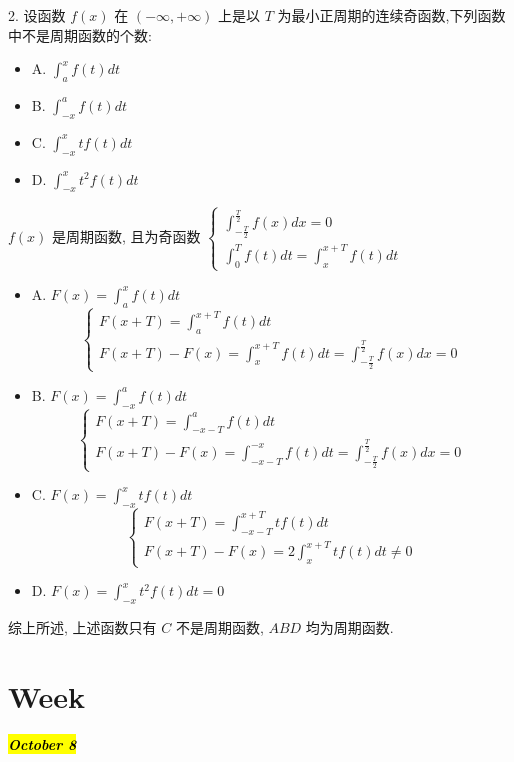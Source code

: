 2. 设函数 $f(x)$ 在 $(-\infty,+\infty)$ 上是以 $T$ 为最小正周期的连续奇函数,下列函数中不是周期函数的个数:  
\begin{itemize}
	\item A. $\int_{a}^{x}f(t)dt$
	\item B. $\int_{-x}^{a}f(t)dt$
	\item C. $\int_{-x}^{x}tf(t)dt$
	\item D. $\int_{-x}^{x}t^2f(t)dt$
\end{itemize}
\begin{solution}

	$f(x)$ 是周期函数, 且为奇函数 $
	\begin{cases}
		\displaystyle{\int_{-\frac{T}{2}}^{\frac{T}{2}}f(x)dx = 0}\\
		\displaystyle{\int_{0}^{T}f(t)dt = \int_{x}^{x+T}f(t)dt}
	\end{cases}$
	
	\begin{itemize}
		\item A. $\displaystyle{F(x) = \int_{a}^{x}f(t)dt}$
		$$
		\begin{cases}
			\displaystyle{F(x+T) = \int_{a}^{x+T}f(t)dt}\\
			\displaystyle{F(x+T)-F(x) = \int_{x}^{x+T}f(t)dt=\int_{-\frac{T}{2}}^{\frac{T}{2}}f(x)dx = 0}
		\end{cases}
		$$
		\item B. $\displaystyle{F(x)=\int_{-x}^{a}f(t)dt}$
		$$
		\begin{cases}
			\displaystyle{F(x+T) = \int_{-x-T}^{a}f(t)dt}\\
			\displaystyle{F(x+T)-F(x) = \int_{-x-T}^{-x}f(t)dt = \int_{-\frac{T}{2}}^{\frac{T}{2}}f(x)dx = 0}
		\end{cases}
		$$ 
		\item C. $\displaystyle{F(x)=\int_{-x}^{x}tf(t)dt}$
		$$
		\begin{cases}
			\displaystyle{F(x+T) = \int_{-x-T}^{x+T}tf(t)dt}\\
			\displaystyle{F(x+T)-F(x) = 2\int_{x}^{x+T}tf(t)dt\neq 0}
		\end{cases}
		$$ 
		\item D. $\displaystyle{F(x)=\int_{-x}^{x}t^{2}f(t)dt = 0}$
	\end{itemize}
	
	综上所述, 上述函数只有 $C$ 不是周期函数, $ABD$ 均为周期函数.
\end{solution}

\section{Week }
\hl{\textbf{\textit{October 8}}}

